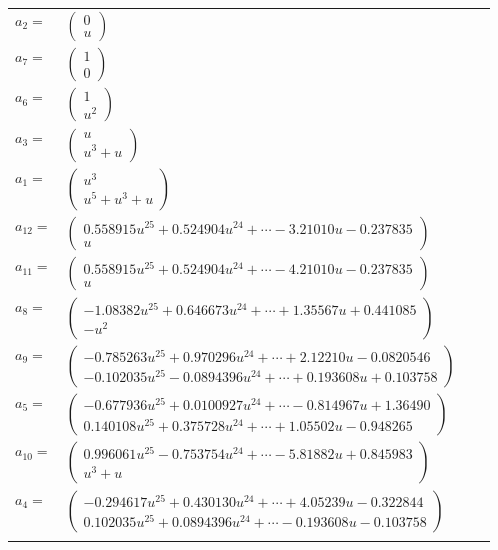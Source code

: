 \documentclass[1p]{elsarticle_modified}
\theoremstyle{definition}
\begin{document}
\begin{tabular}{m{7pt} m{180pt} m{7pt} m{180pt} }
\flushright $a_{2}=$&$\begin{pmatrix}0\\u\end{pmatrix}$ \\
\flushright $a_{7}=$&$\begin{pmatrix}1\\0\end{pmatrix}$ \\
\flushright $a_{6}=$&$\begin{pmatrix}1\\u^2\end{pmatrix}$ \\
\flushright $a_{3}=$&$\begin{pmatrix}u\\u^3+u\end{pmatrix}$ \\
\flushright $a_{1}=$&$\begin{pmatrix}u^3\\u^5+u^3+u\end{pmatrix}$ \\
\flushright $a_{12}=$&$\begin{pmatrix}0.558915 u^{25}+0.524904 u^{24}+\cdots-3.21010 u-0.237835\\u\end{pmatrix}$ \\
\flushright $a_{11}=$&$\begin{pmatrix}0.558915 u^{25}+0.524904 u^{24}+\cdots-4.21010 u-0.237835\\u\end{pmatrix}$ \\
\flushright $a_{8}=$&$\begin{pmatrix}-1.08382 u^{25}+0.646673 u^{24}+\cdots+1.35567 u+0.441085\\- u^2\end{pmatrix}$ \\
\flushright $a_{9}=$&$\begin{pmatrix}-0.785263 u^{25}+0.970296 u^{24}+\cdots+2.12210 u-0.0820546\\-0.102035 u^{25}-0.0894396 u^{24}+\cdots+0.193608 u+0.103758\end{pmatrix}$ \\
\flushright $a_{5}=$&$\begin{pmatrix}-0.677936 u^{25}+0.0100927 u^{24}+\cdots-0.814967 u+1.36490\\0.140108 u^{25}+0.375728 u^{24}+\cdots+1.05502 u-0.948265\end{pmatrix}$ \\
\flushright $a_{10}=$&$\begin{pmatrix}0.996061 u^{25}-0.753754 u^{24}+\cdots-5.81882 u+0.845983\\u^3+u\end{pmatrix}$ \\
\flushright $a_{4}=$&$\begin{pmatrix}-0.294617 u^{25}+0.430130 u^{24}+\cdots+4.05239 u-0.322844\\0.102035 u^{25}+0.0894396 u^{24}+\cdots-0.193608 u-0.103758\end{pmatrix}$\\&\end{tabular}
\end{document}

